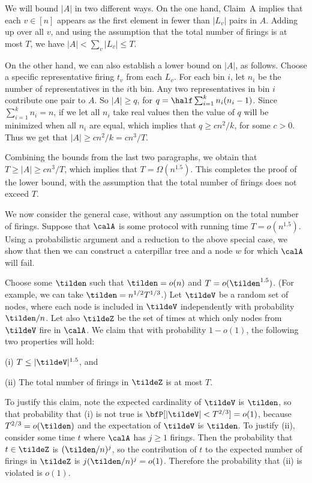 We will bound $|A|$ in two different ways. On the one hand, Claim~A implies that 
each $v \in[n]$ appears as the first element in fewer than $|L_v|$ pairs in $A$. 
Adding up over all $v$, and using the assumption that the total number of firings
is at most $T$, we have $|A| <  \sum_v |L_v| \le T$.

On the other hand, we can also establish a lower bound on $|A|$, as follows.
Choose a specific representative firing $t_v$ from each $L_v$. 
For each bin $i$, let $n_i$ be the number of representatives in the $i$th bin.
Any two representatives in bin $i$ contribute one pair to $A$. 
So $|A| \ge q$, for $q= \half\sum_{i=1}^k n_i(n_i-1)$.
Since $\sum_{i=1}^k n_i = n$, if we let all $n_i$ take real values then
the value of $q$ will be minimized when all $n_i$ are equal,
which implies that $q \ge cn^2/k$, for some $c > 0$.
Thus we get that $|A|\ge cn^2/k = cn^3/T$.

Combining the bounds from the last two paragraphs, we obtain that
$T \ge |A| \ge cn^3/T$, which implies that $T = \Omega(n^{1.5})$.
This completes the proof of the lower bound, with the assumption that the total
number of firings does not exceed $T$.

\smallskip

We now consider the general case, without any assumption on the total number
of firings. 
Suppose that $\calA$ is some protocol with running time  $T = o(n^{1.5})$.
Using a probabilistic argument and a reduction to the above special case,
we show that then we can construct a 
caterpillar tree and a node $w$ for which $\calA$ will fail.

Choose some $\tilden$ such that $\tilden = o(n)$ and
$T = o(\tilden^{1.5})$. (For example, we can take $\tilden = n^{1/2}T^{1/3}$.)
Let $\tildeV$ be a random set of nodes, where each node 
is included in $\tildeV$ independently with probability $\tilden/n$.  
Let also $\tildeZ$ be the set of times at which only nodes from $\tildeV$ fire in $\calA$. 
We claim that with probability $1-o(1)$, the following two 
properties will hold:
\begin{description}
\item{(i)} $T \leq |\tildeV|^{1.5}$, and
\item{(ii)} The total number of firings in $\tildeZ$ is at most $T$.
\end{description}
To justify this claim, note the expected cardinality of $\tildeV$ is $\tilden$,
so that probability that (i) is not true is
$\bfP[|\tildeV| < T^{2/3}] = o(1)$, because $T^{2/3} = o(\tilden)$ and the expectation of 
$\tildeV$ is $\tilden$.
To justify (ii), consider some time $t$ where $\calA$ has $j\ge 1$ firings.
Then the probability that $t\in\tildeZ$ is  $(\tilden/n)^j$, so
the contribution of $t$ to the expected number of firings in $\tildeZ$ is $j(\tilden/n)^j = o(1)$.
Therefore the probability that (ii) is violated is $o(1)$.

